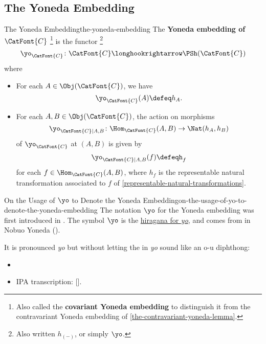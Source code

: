 \subsection{The Yoneda Embedding}\label{subsection-the-yoneda-embedding}
\begin{definition}{The Yoneda Embedding}{the-yoneda-embedding}%
    The \textbf{Yoneda embedding of $\CatFont{C}$}%
    \footnote{%
        Also called the \textbf{covariant Yoneda embedding} to distinguish it from the contravariant Yoneda embedding of \cref{the-contravariant-yoneda-lemma}.
    } %
    is the functor%
    \footnote{%
        Also written $h_{(-)}$, or simply $\yo$.
        \par\vspace*{-1.75\baselineskip}
    } %
    \[
        \yo_{\CatFont{C}}%
        \colon%
        \CatFont{C}%
        \longhookrightarrow%
        \PSh(\CatFont{C})%
    \]%
    where
    \begin{itemize}
        \item{}For each $A\in\Obj(\CatFont{C})$, we have
            \[
                \yo_{\CatFont{C}}(A)
                \defeq
                h_{A}.
            \]%
        \item{}For each $A,B\in\Obj(\CatFont{C})$, the action on morphisms
            \[
                \yo_{\CatFont{C}|A,B}%
                \colon%
                \Hom_{\CatFont{C}}(A,B)%
                \to%
                \Nat(h_{A},h_{B})%
            \]%
            of $\yo_{\CatFont{C}}$ at $(A,B)$ is given by
            \[
                \yo_{\CatFont{C}|A,B}(f)%
                \defeq%
                h_{f}%
            \]%
            for each $f\in\Hom_{\CatFont{C}}(A,B)$, where $h_{f}$ is the representable natural transformation associated to $f$ of \cref{representable-natural-transformations}.
    \end{itemize}
\end{definition}
\begin{remark}{On the Usage of $\yo$ to Denote the Yoneda Embedding}{on-the-usage-of-yo-to-denote-the-yoneda-embedding}%
    The notation $\yo$ for the Yoneda embedding was first introduced in \cite{oplax-natural-transformations-twisted-quantum-field-theories-and-even-higher-morita-categories}. The symbol $\yo$ is the \href{https://en.wikipedia.org/wiki/Yo_(kana)}{hiragana for \emph{yo}}, and comes from  in Nobuo Yoneda ().

    \indent It is pronounced \emph{yo} but without letting the  in \emph{yo} sound like an o-u diphthong:
    \begin{itemize}
        \item {}
        \item IPA transcription: [].
    \end{itemize}
\end{remark}
